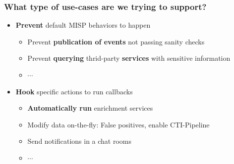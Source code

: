 \begin{frame}
    \frametitle{What type of use-cases are we trying to support?}
    \begin{itemize}
        \item \textbf{Prevent} default MISP behaviors to happen
        \begin{itemize}
            \item Prevent \textbf{publication of events} not passing sanity checks
            \item Prevent \textbf{querying} thrid-party \textbf{services} with sensitive information
            \item $\cdots$
        \end{itemize}
        \vspace*{1.0em}
        \item \textbf{Hook} specific actions to run callbacks
        \begin{itemize}
            \item \textbf{Automatically run} enrichment services
            \item Modify data on-the-fly: False positives, enable CTI-Pipeline
            \item Send notifications in a chat rooms
            \item $\cdots$
        \end{itemize}
    \end{itemize}
\end{frame}

